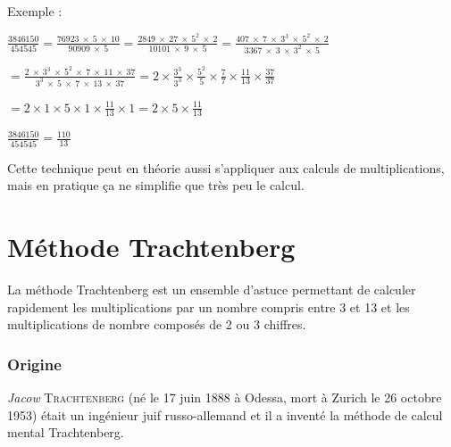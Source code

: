 \documentclass[a4paper, twoside]{article}
\begin{document}
			{\noindent Exemple :}

			\vspace{2 mm}

			{\Large $ \frac{3846150}{454545} = \frac{76923 ~ \times ~ 5 ~ \times ~ 10}{90909 ~ \times ~ 5} = \frac{2849 ~ \times ~ 27 ~ \times ~ 5^2 ~ \times ~ 2}{10101 ~ \times ~ 9 ~ \times ~ 5} = \frac{407 ~ \times ~ 7 ~ \times ~ 3^3 ~ \times ~ 5^2 ~ \times ~ 2}{3367 ~ \times ~ 3 ~ \times ~ 3^2 ~ \times ~ 5}$}

			\vspace{4 mm}

			{\Large {} $= \frac{2 ~ \times ~ 3^3 ~ \times ~ 5^2 ~ \times ~ 7 ~ \times ~ 11 ~ \times ~ 37}{3^3 ~ \times ~ 5 ~ \times ~ 7 ~ \times ~ 13 ~ \times ~ 37} = 2 \times \frac{3^3}{3^3} \times \frac{5^2}{5} \times \frac{7}{7} \times \frac{11}{13} \times \frac{37}{37}$}

			\vspace{4 mm}

			{\Large {} $= 2 \times 1 \times 5 \times 1 \times \frac{11}{13} \times 1 = 2 \times 5 \times \frac{11}{13}$}

			\vspace{6 mm}

			{\Large $ \frac{3846150}{454545} = \frac{110}{13}$}

			\vspace{1.5 cm}

			Cette technique peut en théorie aussi s'appliquer aux calculs de multiplications, mais en pratique ça ne simplifie que très peu le calcul.

\newpage

	\section{Méthode Trachtenberg}

		\vfill

		La méthode Trachtenberg est un ensemble d'astuce permettant de calculer rapidement 
		les multiplications par un nombre compris entre 3 et 13 et 
		les multiplications de nombre composés de 2 ou 3 chiffres.

		\vfill

		\subsubsection*{Origine}

			\textit{Jacow} {\scshape Trachtenberg} (né le 17 juin 1888 à Odessa, mort à Zurich le 
			26 octobre 1953) était un ingénieur juif russo-allemand et 
			il a inventé la méthode de calcul mental Trachtenberg.\\
\end{document}
